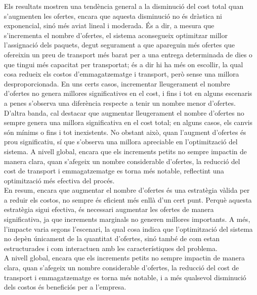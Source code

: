 \documentclass[a4paper]{article}
\begin{document}
\begin{table}[ht]
	Els resultats mostren una tendència general a la disminució del cost total quan s'augmenten les ofertes, encara que aquesta disminució no és dràstica ni exponencial, sinó més aviat lineal i moderada. És a dir, a mesura que s'incrementa el nombre d'ofertes, el sistema aconsegueix optimitzar millor l'assignació dels paquets, degut segurament a que apareguin més ofertes que ofereixin un preu de transport més barat per a una entrega determinada de dies o que tingui més capacitat per transportat; és a dir hi ha més on escollir, la qual cosa redueix els costos d'emmagatzematge i transport, però sense una millora desproporcionada. En uns certs casos, incrementar lleugerament el nombre d'ofertes no genera millores significatives en el cost, i fins i tot en alguns escenaris a penes s'observa una diferència respecte a tenir un nombre menor d'ofertes.\\
	D'altra banda, cal destacar que augmentar lleugerament el nombre d'ofertes no sempre genera una millora significativa en el cost total; en alguns casos, els canvis són mínims o fins i tot inexistents. No obstant això, quan l'augment d'ofertes és prou significatiu, sí que s'observa una millora apreciable en l'optimització del sistema. A nivell global, encara que els increments petits no sempre impactin de manera clara, quan s'afegeix un nombre considerable d'ofertes, la reducció del cost de transport i emmagatzematge es torna més notable, reflectint una optimització més efectiva del procés.\\
	En resum, encara que augmentar el nombre d'ofertes és una estratègia vàlida per a reduir els costos, no sempre és eficient més enllà d'un cert punt. Perquè aquesta estratègia sigui efectiva, és necessari augmentar les ofertes de manera significativa, ja que increments marginals no generen millores importants. A més, l'impacte varia segons l'escenari, la qual cosa indica que l'optimització del sistema no depèn únicament de la quantitat d'ofertes, sinó també de com estan estructurades i com interactuen amb les característiques del problema.\\
	A nivell global, encara que els increments petits no sempre impactin de manera clara, quan s'afegeix un nombre considerable d'ofertes, la reducció del cost de transport i emmagatzematge es torna més notable, i a més qualsevol disminució dels costos és beneficiós per a l'empresa.\\
	

\end{table}
\end{document}
